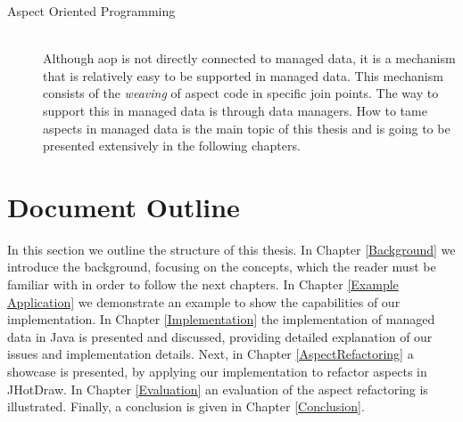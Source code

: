 \begin{description}
  \item[Aspect Oriented Programming]~\\
  Although \ac{aop} is not directly connected to managed data, it is a mechanism that is relatively easy to be supported in managed data.
  This mechanism consists of the \textit{weaving} of aspect code in specific join points. 
  The way to support this in managed data is through data managers. 
  How to tame aspects in managed data is the main topic of this thesis and is going to be presented extensively in the following chapters.

\end{description}

\section{Document Outline}\label{Document Outline}
In this section we outline the structure of this thesis. 
In Chapter \ref{Background} we introduce the background, focusing on the concepts, which the reader must be familiar with in order to follow the next chapters.
In Chapter \ref{Example Application} we demonstrate an example to show the capabilities of our implementation.
In Chapter \ref{Implementation} the implementation of managed data in Java is presented and discussed, providing detailed explanation of our issues and implementation details.
Next, in Chapter \ref{AspectRefactoring} a showcase is presented, by applying our implementation to refactor aspects in JHotDraw.
In Chapter \ref{Evaluation} an evaluation of the aspect refactoring is illustrated.
Finally, a conclusion is given in Chapter \ref{Conclusion}. 

